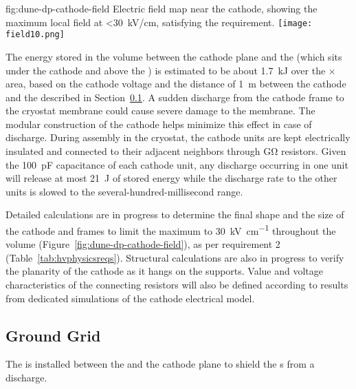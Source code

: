 \begin{dunefigure}{fig:dune-dp-cathode-field}
{Electric field map near the cathode, showing the maximum local field at <\SI{30}{kV/cm}, satisfying the requirement.} 
\texttt{[image: field10.png]}
\end{dunefigure}
The energy stored in the volume between the cathode plane and the  (which sits under the cathode and above the ) is estimated to be about \SI{1.7}{\kilo\joule} over the \dptpcwdth $\times$ \dptpclen area, based on the cathode voltage and the distance of \SI{1}{\m} between the cathode and the  described in Section~\ref{sec:dp-hv-groundgrid}. 
A sudden discharge from the cathode frame to the cryostat membrane could cause severe damage to the membrane.
The modular construction of the cathode helps minimize this effect in case of discharge. During assembly in the cryostat, the cathode units are kept electrically insulated and connected to their adjacent neighbors through \si{\giga\ohm}  
resistors. Given the \SI{100}{\pico\farad} capacitance of each cathode unit, any discharge occurring in one unit will release at most 
\SI{21}{\joule} of stored energy while the discharge rate  
to the other units is slowed to the several-hundred-millisecond range.

Detailed calculations are in progress to determine the final shape and the size of the cathode and  frames to %
limit the maximum \efield to \SI{30}{\kV\per\cm}  
throughout the \lar volume (Figure~\ref{fig:dune-dp-cathode-field}), as per requirement 2 (Table~\ref{tab:hvphysicsreqs}).  Structural calculations are also in progress to verify the planarity of the cathode as it hangs on the  supports.
Value and voltage characteristics of the connecting resistors will also be defined according to results from dedicated simulations of the cathode electrical model.


\subsection{Ground Grid}
\label{sec:dp-hv-groundgrid}
The  is installed between the  and the cathode plane to shield the \pmt{}s from a discharge.  

